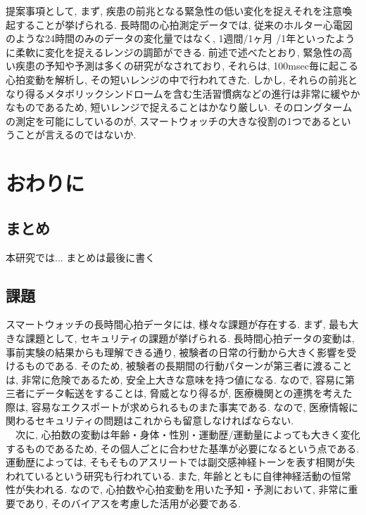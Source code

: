 \documentclass[report, 11pt, a4paper]{jsbook}
\begin{document}
提案事項として, まず, 疾患の前兆となる緊急性の低い変化を捉えそれを注意喚起することが挙げられる. 長時間の心拍測定データでは, 従来のホルター心電図のような24時間のみのデータの変化量ではなく, 1週間/1ヶ月 /1年といったように柔軟に変化を捉えるレンジの調節ができる. 前述で述べたとおり, 緊急性の高い疾患の予知や予測は多くの研究がなされており, それらは, 100msec毎に起こる心拍変動を解析し, その短いレンジの中で行われてきた. しかし, それらの前兆となり得るメタボリックシンドロームを含む生活習慣病などの進行は非常に緩やかなものであるため, 短いレンジで捉えることはかなり厳しい. そのロングタームの測定を可能にしているのが, スマートウォッチの大きな役割の1つであるということが言えるのではないか.\\  


\chapter{おわりに}

\section{まとめ}
本研究では...
まとめは最後に書く

\section{課題}
スマートウォッチの長時間心拍データには, 様々な課題が存在する. まず, 最も大きな課題として, セキュリティの課題が挙げられる. 長時間心拍データの変動は, 事前実験の結果からも理解できる通り, 被験者の日常の行動から大きく影響を受けるものである. そのため, 被験者の長期間の行動パターンが第三者に渡ることは, 非常に危険であるため, 安全上大きな意味を持つ値になる. なので, 容易に第三者にデータ転送をすることは, 脅威となり得るが, 医療機関との連携を考えた際は, 容易なエクスポートが求められるものまた事実である. なので, 医療情報に関わるセキュリティの問題はこれからも留意しなければならない. \\
　次に, 心拍数の変動は年齢・身体・性別・運動歴/運動量によっても大きく変化するものであるため, その個人ごとに合わせた基準が必要になるという点である. 運動歴によっては, そもそものアスリートでは副交感神経トーンを表す相関が失われているという研究も行われている. また, 年齢とともに自律神経活動の恒常性が失われる. なので, 心拍数や心拍変動を用いた予知・予測において, 非常に重要であり, そのバイアスを考慮した活用が必要である.
\end{document}
